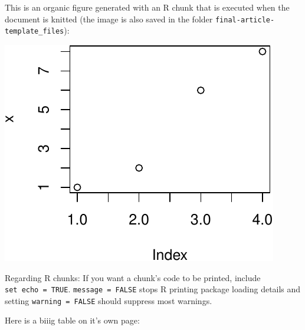 \documentclass[12pt,preprint, authoryear]{article}
\numberwithin{equation}{section}
\numberwithin{figure}{section}
\numberwithin{table}{section}
\begin{document}
This is an organic figure generated with an R chunk that is executed
when the document is knitted (the image is also saved in the folder
\texttt{final-article-template\_files}):

\begin{center}\includegraphics[width=0.4\linewidth]{final-article-template_files/figure-latex/unnamed-chunk-2-1} \end{center}

Regarding R chunks: If you want a chunk's code to be printed, include
\texttt{set\ echo\ =\ TRUE}. \texttt{message\ =\ FALSE} stops R printing
package loading details and setting \texttt{warning\ =\ FALSE} should
suppress most warnings.

Here is a biiig table on it's own page:

\scriptsize
\end{document}
